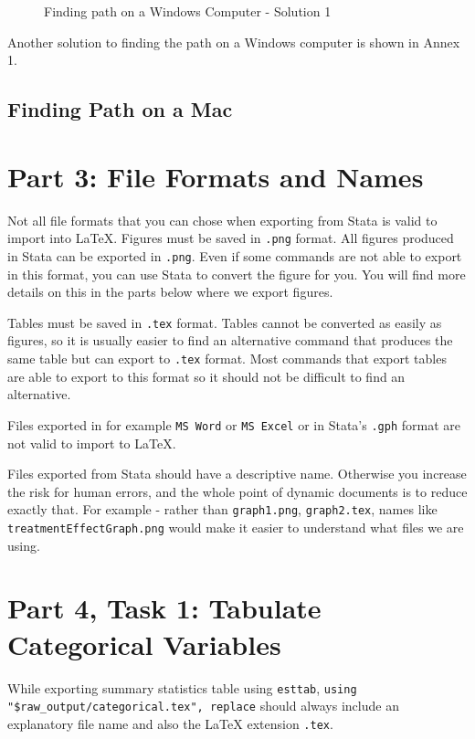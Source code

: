 \documentclass[]{article}
\begin{document}
\begin{figure}[H]
	\centering
	\caption{Finding path on a Windows Computer - Solution 1}
	\label{fig:pathwin3}
\end{figure}


Another solution to finding the path on a Windows computer is shown in Annex 1.
	
\subsection*{Finding Path on a Mac}


\section*{Part 3: File Formats and Names}
Not all file formats that you can chose when exporting from Stata is valid to import into {\LaTeX}. Figures must be saved in \texttt{.png} format. All figures produced in Stata can be exported in \texttt{.png}. Even if some commands are not able to export in this format, you can use Stata to convert the figure for you. You will find more details on this in the parts below where we export figures. 

Tables must be saved in \texttt{.tex} format. Tables cannot be converted as easily as figures, so it is usually easier to find an alternative command that produces the same table but can export to \texttt{.tex} format. Most commands that export tables are able to export to this format so it should not be difficult to find an alternative.

Files exported in for example \texttt{MS Word} or \texttt{MS Excel} or in Stata's \texttt{.gph} format are not valid to import to {\LaTeX}.

Files exported from Stata should have a descriptive name. Otherwise you increase the risk for human errors, and the whole point of dynamic documents is to reduce exactly that. For example - rather than \texttt{graph1.png}, \texttt{graph2.tex}, names like \texttt{treatmentEffectGraph.png} would make it easier to understand what files we are using.

\section*{Part 4, Task 1: Tabulate Categorical Variables}

While exporting summary statistics table using \texttt{esttab}, \verb|using 	"$raw_output/categorical.tex", replace| should always include an explanatory file name and also the {\LaTeX} extension \texttt{.tex}.
\end{document}
